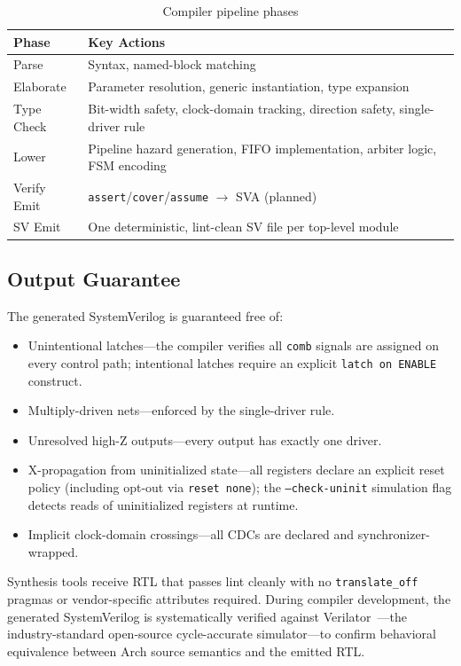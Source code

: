 \documentclass[11pt,twocolumn]{article}
\begin{document}
\begin{table}[t]
\centering
\caption{Compiler pipeline phases}
\label{tab:compiler}
\small
\begin{tabular}{@{}lp{5cm}@{}}
\toprule
\textbf{Phase} & \textbf{Key Actions} \\
\midrule
Parse & Syntax, named-block matching \\
Elaborate & Parameter resolution, generic instantiation, type expansion \\
Type Check & Bit-width safety, clock-domain tracking, direction safety, single-driver rule \\
Lower & Pipeline hazard generation, FIFO implementation, arbiter logic, FSM encoding \\
Verify Emit & \texttt{assert}/\texttt{cover}/\texttt{assume} $\to$ SVA (planned) \\
SV Emit & One deterministic, lint-clean SV file per top-level module \\
\bottomrule
\end{tabular}
\end{table}

\subsection{Output Guarantee}

The generated SystemVerilog is guaranteed free of:
\begin{itemize}
\item Unintentional latches---the compiler verifies all \texttt{comb} signals are assigned on every control path; intentional latches require an explicit \texttt{latch on ENABLE} construct.
\item Multiply-driven nets---enforced by the single-driver rule.
\item Unresolved high-Z outputs---every output has exactly one driver.
\item X-propagation from uninitialized state---all registers declare an explicit reset policy (including opt-out via \texttt{reset none}); the \texttt{--check-uninit} simulation flag detects reads of uninitialized registers at runtime.
\item Implicit clock-domain crossings---all CDCs are declared and synchronizer-wrapped.
\end{itemize}

Synthesis tools receive RTL that passes lint cleanly with no \texttt{translate\_off} pragmas or vendor-specific attributes required. During compiler development, the generated SystemVerilog is systematically verified against Verilator~\cite{verilator}---the industry-standard open-source cycle-accurate simulator---to confirm behavioral equivalence between Arch source semantics and the emitted RTL.
\end{document}
